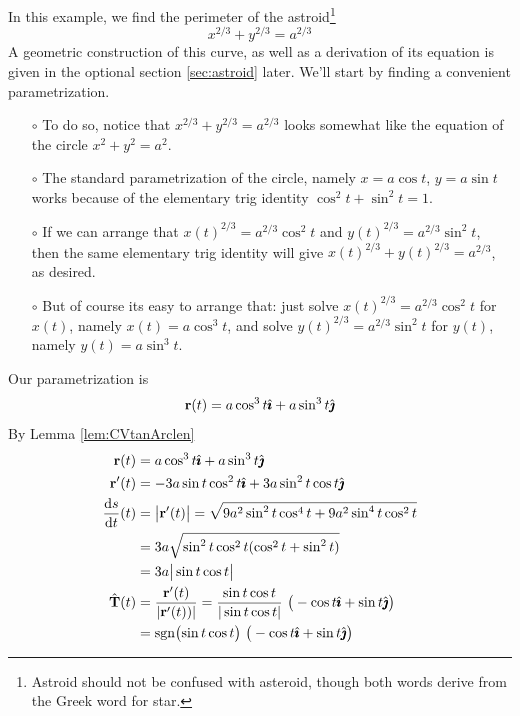 \begin{eg}\label{eg:astroid}
In this example, we find the perimeter of the astroid\footnote{
Astroid should not be confused with asteroid, though both words derive 
from the Greek word for star.}
\begin{equation*}
x^{2/3}+y^{2/3} = a^{2/3}
\end{equation*}
A geometric construction of this curve, as well as a derivation of its equation is given in the optional section \ref{sec:astroid} later.  We'll start by finding a convenient
parametrization. 
\begin{itemize}\itemsep1pt \parskip0pt  %
\item[$\circ$]
To do so, notice that $x^{2/3}+y^{2/3} = a^{2/3}$ looks somewhat like the
equation of the circle $x^2+y^2=a^2$. 
\item[$\circ$]
The standard parametrization of the circle, namely
$x=a\cos t$, $y=a \sin t$ works because of the elementary trig identity $\cos^2t+\sin^2t=1$.
\item[$\circ$]
If we can arrange that $x(t)^{2/3} = a^{2/3}\cos^2 t$ and $y(t)^{2/3}=a^{2/3}\sin^2 t$, then the same elementary trig identity will give $x(t)^{2/3}+y(t)^{2/3} = a^{2/3}$, as desired. 
\item[$\circ$]
But 
of course its easy to arrange that: just solve  $x(t)^{2/3} = a^{2/3}\cos^2 t$ for $x(t)$, 
namely $x(t) = a\cos^3t$, and solve $y(t)^{2/3}=a^{2/3}\sin^2 t$ for $y(t)$,
namely $y(t)=a\sin^3 t$. 
\end{itemize}
Our parametrization is 
\begin{equation*}
\mathbf{r}(t) = a\cos^3t\hat{\pmb{\imath}} + a\sin^3 t\hat{\pmb{\jmath}}
\end{equation*}
By Lemma \ref{lem:CVtanArclen}
\begin{align*}
\vr(t) &= a\cos^3t\hi + a\sin^3 t\hj \\
\vr'(t) &= -3a\sin t\cos^2t\hi + 3a\sin^2 t\cos t\hj \\
\diff{s}{t}(t)&=\big|\vr'(t)\big| 
= \sqrt{9a^2\sin^2t\cos^4t + 9a^2\sin^4t\cos^2t} \\
& = 3a \sqrt{\sin^2t\cos^2t(\cos^2t+\sin^2t)} \\
 &=3a\big|\sin t\cos t\big| \\
\hat\vT(t) &= \frac{\vr'(t)}{|\vr'(t))|}
=  \frac{\sin t\cos t}{|\sin t\cos t|}\ \big(-\cos t\hi+\sin t\hj\big)
\\
 &=  \sgn\!\big(\!\sin t\cos t\big)\ \big(-\cos t\hi+\sin t\hj\big) 
\end{align*}

\end{eg}
